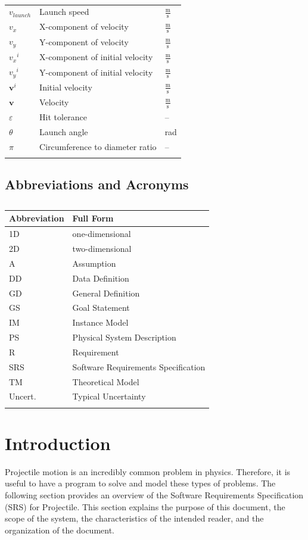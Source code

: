 \documentclass[12pt]{article}
\begin{document}
\begin{longtabu}{l X[l] l}
\\
${v_{launch}}$ & Launch speed & $\frac{\text{m}}{\text{s}}$
\\
${v_{x}}$ & X-component of velocity & $\frac{\text{m}}{\text{s}}$
\\
${v_{y}}$ & Y-component of velocity & $\frac{\text{m}}{\text{s}}$
\\
${{v_{x}}^{i}}$ & X-component of initial velocity & $\frac{\text{m}}{\text{s}}$
\\
${{v_{y}}^{i}}$ & Y-component of initial velocity & $\frac{\text{m}}{\text{s}}$
\\
${\mathbf{v}^{i}}$ & Initial velocity & $\frac{\text{m}}{\text{s}}$
\\
$\mathbf{v}$ & Velocity & $\frac{\text{m}}{\text{s}}$
\\
$ε$ & Hit tolerance & --
\\
$θ$ & Launch angle & rad
\\
$π$ & Circumference to diameter ratio & --
\\
\bottomrule
\caption{}
\label{Table:ToS}
\end{longtabu}
\subsection{Abbreviations and Acronyms}
\label{Sec:TAbbAcc}
\begin{longtable}{l l}
\toprule
Abbreviation & Full Form
\\
\midrule
\endhead
1D & one-dimensional
\\
2D & two-dimensional
\\
A & Assumption
\\
DD & Data Definition
\\
GD & General Definition
\\
GS & Goal Statement
\\
IM & Instance Model
\\
PS & Physical System Description
\\
R & Requirement
\\
SRS & Software Requirements Specification
\\
TM & Theoretical Model
\\
Uncert. & Typical Uncertainty
\\
\bottomrule
\caption{}
\label{Table:TAbbAcc}
\end{longtable}
\section{Introduction}
\label{Sec:Intro}
Projectile motion is an incredibly common problem in physics. Therefore, it is useful to have a program to solve and model these types of problems.
The following section provides an overview of the Software Requirements Specification (SRS) for Projectile. This section explains the purpose of this document, the scope of the system, the characteristics of the intended reader, and the organization of the document.
\end{document}
